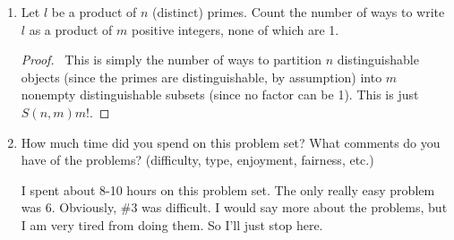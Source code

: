 \documentclass[12pt]{article}
\begin{document}
\begin{enumerate}[leftmargin=0cm,itemindent=.5cm,labelwidth=\itemindent,labelsep=0cm,align=left]
\begin{enumerate}
\begin{proof}

\begin{align*}
\sum_{k=0}^n k \binom{n}{k} =
\sum_{k=1}^n k \cdot \frac{n}{k}\binom{n-1}{k-1}
= n \sum_{k=0}^{n-1} \binom{n-1}{k}
= n \cdot 2^{n-1}.
\end{align*}

\end{proof}

\item \ An (actual!!) paper has its final answer ``simplified" to
$$
\sum\limits_{k=0}^n k \frac{\binom{m-k-1}{m-n-1}}{\binom{m}{n}}.
$$
\noindent Simplify it further.

\begin{proof}
\begin{align*}
\sum\limits_{k=0}^n k \frac{\binom{m-k-1}{m-n-1}}{\binom{m}{n}}
&= \frac{1}{\binom{m}{n}}\sum\limits_{k=0}^n \left( m - (m-n)\frac{m-k}{m-n} \right) \binom{m-k-1}{m-n-1}
\\
&= \frac{m}{\binom{m}{n}}\sum\limits_{k=0}^n  \binom{m-k-1}{m-n-1} - \frac{m-n}{\binom{m}{n}}\sum\limits_{k=0}^n \binom{m-k}{m-n}
\\
&= \frac{m}{\binom{m}{n}} \binom{m}{n} - (m-n)\frac{\binom{m+1}{n}}{\binom{m}{n}}
\\
&= m - (m-n)\frac{m+1}{m-n+1}
\\
&= \frac{m(m-n) + m - m(m-n) - (m-n)}{m-n+1}
\\
&=\frac{n}{m-n+1}.
\end{align*}
\end{proof}

\end{enumerate}

\item Let $l$ be a product of $n$ (distinct) primes.  Count the number of ways to write $l$ as a product of $m$ positive integers, none of which are 1.

\begin{proof}
\ This is simply the number of ways to partition $n$ distinguishable objects (since the primes are distinguishable, by assumption) into $m$ nonempty distinguishable subsets (since no factor can be 1).  This is just $S(n,m)m!$.
\end{proof}

\item How much time did you spend on this problem set?  What comments do you have of the problems? (difficulty, type, enjoyment, fairness, etc.)

I spent about 8-10 hours on this problem set.  The only really easy problem was 6.  Obviously, \#3 was difficult.  I would say more about the problems, but I am very tired from doing them.  So I'll just stop here.

\end{enumerate}
\end{document}
